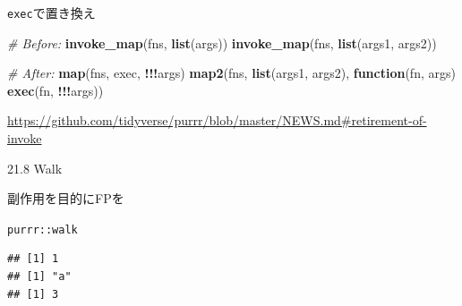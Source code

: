 \documentclass[ignorenonframetext,]{beamer}
\newenvironment{Shaded}{\begin{snugshade}}{\end{snugshade}}
\newcommand{\KeywordTok}[1]{\textcolor[rgb]{0.13,0.29,0.53}{\textbf{#1}}}
\newcommand{\DecValTok}[1]{\textcolor[rgb]{0.00,0.00,0.81}{#1}}
\newcommand{\StringTok}[1]{\textcolor[rgb]{0.31,0.60,0.02}{#1}}
\newcommand{\CommentTok}[1]{\textcolor[rgb]{0.56,0.35,0.01}{\textit{#1}}}
\newcommand{\ControlFlowTok}[1]{\textcolor[rgb]{0.13,0.29,0.53}{\textbf{#1}}}
\newcommand{\OperatorTok}[1]{\textcolor[rgb]{0.81,0.36,0.00}{\textbf{#1}}}
\newcommand{\NormalTok}[1]{#1}
\begin{document}
\begin{frame}[fragile]{\texttt{exec}で置き換え}

\begin{Shaded}
\begin{Highlighting}[]
\CommentTok{# Before:}
\KeywordTok{invoke_map}\NormalTok{(fns, }\KeywordTok{list}\NormalTok{(args))}
\KeywordTok{invoke_map}\NormalTok{(fns, }\KeywordTok{list}\NormalTok{(args1, args2))}

\CommentTok{# After:}
\KeywordTok{map}\NormalTok{(fns, exec, }\OperatorTok{!!!}\NormalTok{args)}
\KeywordTok{map2}\NormalTok{(fns, }\KeywordTok{list}\NormalTok{(args1, args2), }\ControlFlowTok{function}\NormalTok{(fn, args) }\KeywordTok{exec}\NormalTok{(fn, }\OperatorTok{!!!}\NormalTok{args))}
\end{Highlighting}
\end{Shaded}

\url{https://github.com/tidyverse/purrr/blob/master/NEWS.md\#retirement-of-invoke}

\end{frame}

\begin{frame}{21.8 Walk}

副作用を目的にFPを

\end{frame}

\begin{frame}[fragile]{\texttt{purrr::walk}}

\begin{Shaded}
\end{Shaded}

\begin{verbatim}
## [1] 1
## [1] "a"
## [1] 3
\end{verbatim}

\end{frame}
\end{document}
